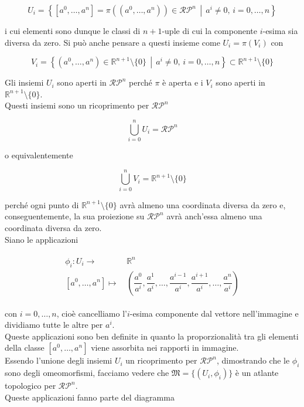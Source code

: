 \begin{equation}
	U_{i} = \left\{ [a^{0},\dots,a^{n}] = \pi((a^{0},\dots,a^{n})) \in \mathcal{RP}^{n} \, \middle| \, a^{i} \neq 0, \, i=0,\dots,n \right\}
\end{equation}

i cui elementi sono dunque le classi di $ n+1 $-uple di cui la componente $ i $-esima sia diversa da zero. Si può anche pensare a questi insieme come $ U_{i} = \pi(V_{i}) $ con

\begin{equation}
	V_{i} = \left\{ (a^{0},\dots,a^{n}) \in \mathbb{R}^{n+1} \setminus \{0\} \, \middle| \, a^{i} \neq 0, \, i=0,\dots,n \right\} \subset \mathbb{R}^{n+1} \setminus \{0\}
\end{equation}

Gli insiemi $ U_{i} $ sono aperti in $ \mathcal{RP}^{n} $ perché $ \pi $ è aperta e i $ V_{i} $ sono aperti in $ \mathbb{R}^{n+1} \setminus \{0\} $.\\
Questi insiemi sono un ricoprimento per $ \mathcal{RP}^{n} $

\begin{equation}
	\bigcup_{i=0}^{n} U_{i} = \mathcal{RP}^{n}
\end{equation}

o equivalentemente

\begin{equation}
	\bigcup_{i=0}^{n} V_{i} = \mathbb{R}^{n+1} \setminus \{0\}
\end{equation}

perché ogni punto di $ \mathbb{R}^{n+1} \setminus \{0\} $ avrà almeno una coordinata diversa da zero e, conseguentemente, la sua proiezione su $ \mathcal{RP}^{n} $ avrà anch'essa almeno una coordinata diversa da zero.\\
Siano le applicazioni

\begin{align}
	\begin{split}
		\phi_{i} : U_{i} \to& \, \mathbb{R}^{n}\\
		[a^{0},\dots,a^{n}] \mapsto& \, \left( \dfrac{a^{0}}{a^{i}}, \dfrac{a^{1}}{a^{i}}, \dots, \dfrac{a^{i-1}}{a^{i}}, \dfrac{a^{i+1}}{a^{i}}, \dots, \dfrac{a^{n}}{a^{i}} \right)
	\end{split}
\end{align}

con $ i=0,\dots,n $, cioè cancelliamo l'$ i $-esima componente dal vettore nell'immagine e dividiamo tutte le altre per $ a^{i} $.\\
Queste applicazioni sono ben definite in quanto la proporzionalità tra gli elementi della classe $ [a^{0},\dots,a^{n}] $ viene assorbita nei rapporti in immagine.\\
Essendo l'unione degli insiemi $ U_{i} $ un ricoprimento per $ \mathcal{RP}^{n} $, dimostrando che le $ \phi_{i} $ sono degli omeomorfismi, facciamo vedere che $ \mathfrak{M} = \{(U_{i},\phi_{i})\} $ è un atlante topologico per $ \mathcal{RP}^{n} $.\\
Queste applicazioni fanno parte del diagramma

